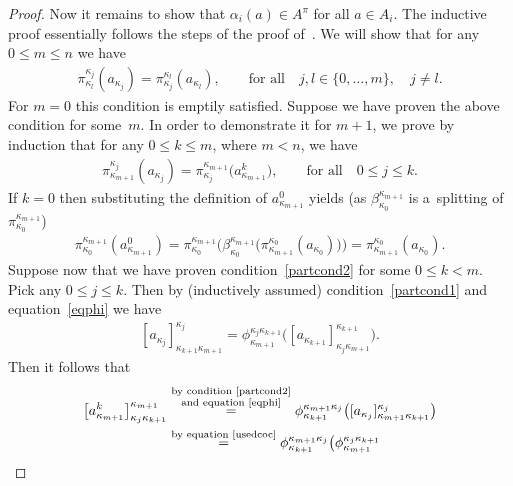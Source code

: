 \begin{proof}
Now it remains to show that $\alpha_i(a)\in A^\pi$ for all $a\in A_i$.
The inductive proof essentially follows the steps of the proof of~\cite[Proposition~9]{CM2000}.
We will show that for any $0\leq m\leq n$ we have
\begin{gather}
\label{partcond1}
\pi^{\kappa_j}_{\kappa_l}(a_{\kappa_j})=\pi^{\kappa_l}_{\kappa_j}(a_{\kappa_l}),
\qquad
\text{for all}
\quad
j,l\in\{0,\ldots,m\},
\quad
j\neq l.
\end{gather}
For $m=0$ this condition is emptily satisf\/ied.
Suppose we have proven the above condition for some~$m$.
In order to demonstrate it for $m+1$, we prove by induction that for any $0\leq k\leq m$, where $m<n$, we have
\begin{gather}
\label{partcond2}
\pi^{\kappa_j}_{\kappa_{m+1}}(a_{\kappa_j})=\pi^{\kappa_{m+1}}_{\kappa_j}\big(a^k_{\kappa_{m+1}}\big),
\qquad
\text{for all}
\quad
0\leq j\leq k.
\end{gather}
If $k=0$ then substituting the def\/inition of $a^0_{\kappa_{m+1}}$ yields (as $\beta^{\kappa_{m+1}}_{\kappa_0}$ is
a~splitting of $\pi^{\kappa_{m+1}}_{\kappa_0}$)
\begin{gather*}
\pi^{\kappa_{m+1}}_{\kappa_0}(a^0_{\kappa_{m+1}}) =\pi^{\kappa_{m+1}}_{\kappa_0}
\big(\beta^{\kappa_{m+1}}_{\kappa_0}\big(\pi^{\kappa_0}_{\kappa_{m+1}}(a_{\kappa_0})\big)\big)
 =\pi^{\kappa_0}_{\kappa_{m+1}}(a_{\kappa_0}).
\end{gather*}
Suppose now that we have proven condition~\eqref{partcond2} for some $0\leq k<m$.
Pick any $0\leq j\leq k$.
Then by (inductively assumed) condition~\eqref{partcond1} and equation~\eqref{eqphi} we have
\begin{gather}
\label{usedcoc}
[a_{\kappa_j}]^{\kappa_j}_{\kappa_{k+1}\kappa_{m+1}}=\phi^{\kappa_j\kappa_{k+1}}_{\kappa_{m+1}}
\big([a_{\kappa_{k+1}}]^{\kappa_{k+1}}_{\kappa_j\kappa_{m+1}}\big).
\end{gather}
Then it follows that
\begin{gather*}
\big[a^k_{\kappa_{m+1}}\big]^{\kappa_{m+1}}_{\kappa_j\kappa_{k+1}}
\overset{\substack{\text{by condition~\eqref{partcond2}} \\ \text{and equation~\eqref{eqphi}}}}{=}\phi^{\kappa_{m+1}\kappa_j}_{\kappa_{k+1}}
\big([a_{\kappa_j}]^{\kappa_j}_{\kappa_{m+1}\kappa_{k+1}}\big)
\\
\qquad{}
\overset{\text{by equation~\eqref{usedcoc}}}{=}
\phi^{\kappa_{m+1}\kappa_j}_{\kappa_{k+1}}\big(\phi^{\kappa_j\kappa_{k+1}}_{\kappa_{m+1}}

\end{gather*}
\end{proof}
